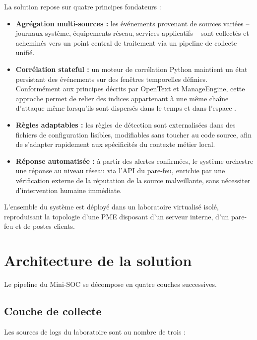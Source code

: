 \documentclass[a4paper,12pt]{article}
\begin{document}
La solution repose sur quatre principes fondateurs :

\begin{itemize}
    \item \textbf{Agrégation multi-sources :} les événements provenant de
    sources variées -- journaux système, équipements réseau, services
    applicatifs -- sont collectés et acheminés vers un point central de
    traitement via un pipeline de collecte unifié.

    \item \textbf{Corrélation stateful :} un moteur de corrélation Python
    maintient un état persistant des événements sur des fenêtres
    temporelles définies. Conformément aux principes décrits par OpenText
    et ManageEngine,
    cette approche permet de relier des indices appartenant à une même
    chaîne d'attaque même lorsqu'ils sont dispersés dans le temps et dans
    l'espace \cite{opentext_event_correlation,manageengine_correlation}.

    \item \textbf{Règles adaptables :} les règles de détection sont
    externalisées dans des fichiers de configuration lisibles, modifiables
    sans toucher au code source, afin de s'adapter rapidement aux
    spécificités du contexte métier local.

    \item \textbf{Réponse automatisée :} à partir des alertes confirmées,
    le système orchestre une réponse au niveau réseau via l'API du
    pare-feu, enrichie par une vérification externe de la réputation de
    la source malveillante, sans nécessiter d'intervention humaine
    immédiate.
\end{itemize}

L'ensemble du système est déployé dans un laboratoire virtualisé isolé,
reproduisant la topologie d'une PME disposant d'un serveur interne, d'un
pare-feu et de postes clients.

\section{Architecture de la solution}

Le pipeline du Mini-SOC se décompose en quatre couches successives.

\subsection*{Couche de collecte}

Les sources de logs du laboratoire sont au nombre de trois :
\end{document}

